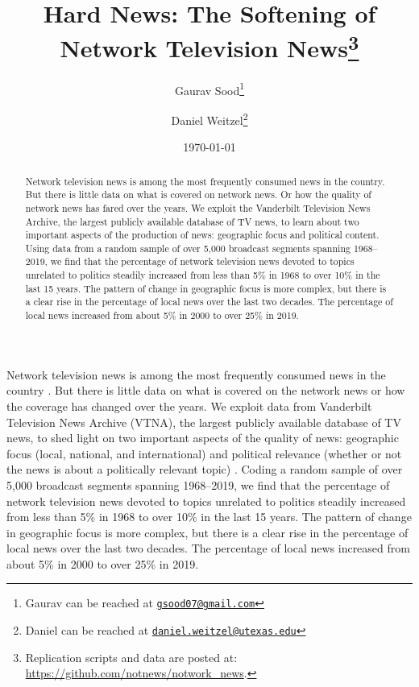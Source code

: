 \documentclass[12pt, letterpaper]{article}
\title{\Large{Hard News: The Softening of Network Television News}\footnote{Replication scripts and data are posted at: \url{https://github.com/notnews/notwork_news}.}}
\author{Gaurav Sood\thanks{Gaurav can be reached at \href{mailto:gsood07@gmail.com}{\footnotesize{\texttt{gsood07@gmail.com}}}}
\and Daniel Weitzel\thanks{Daniel can be reached at \href{mailto:daniel.weitzel@utexas.edu}{\footnotesize{\texttt{daniel.weitzel@utexas.edu}}}}}
\date{\vspace{.5cm}\normalsize{\today}}
\begin{document}
\maketitle

\begin{abstract}
Network television news is among the most frequently consumed news in the country. But there is little data on what is covered on network news. Or how the quality of network news has fared over the years. We exploit the Vanderbilt Television News Archive, the largest publicly available database of TV news, to learn about two important aspects of the production of news: geographic focus and political content. Using data from a random sample of over 5,000 broadcast segments spanning 1968--2019, we find that the percentage of network television news devoted to topics unrelated to politics steadily increased from less than 5\% in 1968 to over 10\% in the last 15 years. The pattern of change in geographic focus is more complex, but there is a clear rise in the percentage of local news over the last two decades. The percentage of local news increased from about 5\% in 2000 to over 25\% in 2019.
\end{abstract}

\clearpage
\doublespacing
Network television news is among the most frequently consumed news in the country \citep{pew2019, pew2020}. But there is little data on what is covered on the network news or how the coverage has changed over the years. We exploit data from Vanderbilt Television News Archive (VTNA), the largest publicly available database of TV news, to shed light on two important aspects of the quality of news: geographic focus (local, national, and international) and political relevance (whether or not the news is about a politically relevant topic) \citep{curran2009media}. Coding a random sample of over 5,000 broadcast segments spanning 1968--2019, we find that the percentage of network television news devoted to topics unrelated to politics steadily increased from less than 5\% in 1968 to over 10\% in the last 15 years. The pattern of change in geographic focus is more complex, but there is a clear rise in the percentage of local news over the last two decades. The percentage of local news increased from about 5\% in 2000 to over 25\% in 2019.
\end{document}
